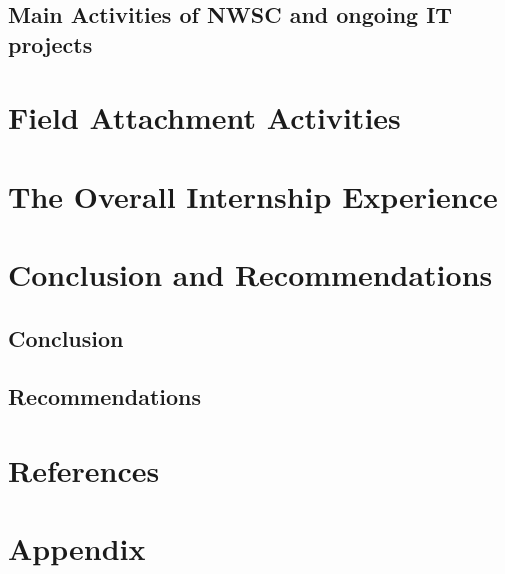\documentclass{article}
\begin{document}
\subsection{Main Activities of NWSC and ongoing IT projects}
\section{Field Attachment Activities}
\section{The Overall Internship Experience}
\section{Conclusion and Recommendations}
\subsection{Conclusion}
\subsection{Recommendations}
\section{References}
\section{Appendix}




\end{document}
